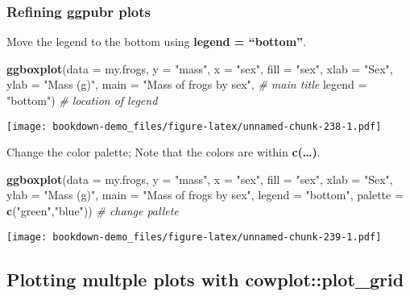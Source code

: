 \documentclass[]{book}
\newenvironment{Shaded}{\begin{snugshade}}{\end{snugshade}}
\newcommand{\KeywordTok}[1]{\textcolor[rgb]{0.13,0.29,0.53}{\textbf{#1}}}
\newcommand{\DataTypeTok}[1]{\textcolor[rgb]{0.13,0.29,0.53}{#1}}
\newcommand{\StringTok}[1]{\textcolor[rgb]{0.31,0.60,0.02}{#1}}
\newcommand{\CommentTok}[1]{\textcolor[rgb]{0.56,0.35,0.01}{\textit{#1}}}
\newcommand{\NormalTok}[1]{#1}
\theoremstyle{definition}
\theoremstyle{definition}
\theoremstyle{definition}
\theoremstyle{remark}
\begin{document}
\subsubsection{Refining ggpubr plots}\label{refining-ggpubr-plots}

Move the legend to the bottom using \textbf{legend = ``bottom''}.

\begin{Shaded}
\begin{Highlighting}[]
\KeywordTok{ggboxplot}\NormalTok{(}\DataTypeTok{data =}\NormalTok{ my.frogs,}
          \DataTypeTok{y =} \StringTok{"mass"}\NormalTok{,}
          \DataTypeTok{x =} \StringTok{"sex"}\NormalTok{,}
          \DataTypeTok{fill =} \StringTok{"sex"}\NormalTok{,}
          \DataTypeTok{xlab =} \StringTok{"Sex"}\NormalTok{,}
          \DataTypeTok{ylab =} \StringTok{"Mass (g)"}\NormalTok{,}
          \DataTypeTok{main =} \StringTok{"Mass of frogs by sex"}\NormalTok{, }\CommentTok{# main title}
          \DataTypeTok{legend =} \StringTok{"bottom"}\NormalTok{)             }\CommentTok{# location of legend}
\end{Highlighting}
\end{Shaded}

\texttt{[image: bookdown-demo\_files/figure-latex/unnamed-chunk-238-1.pdf]}

Change the color palette; Note that the colors are within
\textbf{c(\ldots{})}.

\begin{Shaded}
\begin{Highlighting}[]
\KeywordTok{ggboxplot}\NormalTok{(}\DataTypeTok{data =}\NormalTok{ my.frogs,}
          \DataTypeTok{y =} \StringTok{"mass"}\NormalTok{,}
          \DataTypeTok{x =} \StringTok{"sex"}\NormalTok{,}
          \DataTypeTok{fill =} \StringTok{"sex"}\NormalTok{,}
          \DataTypeTok{xlab =} \StringTok{"Sex"}\NormalTok{,}
          \DataTypeTok{ylab =} \StringTok{"Mass (g)"}\NormalTok{,}
          \DataTypeTok{main =} \StringTok{"Mass of frogs by sex"}\NormalTok{,}
          \DataTypeTok{legend =} \StringTok{"bottom"}\NormalTok{,}
          \DataTypeTok{palette =} \KeywordTok{c}\NormalTok{(}\StringTok{"green"}\NormalTok{,}\StringTok{"blue"}\NormalTok{))  }\CommentTok{# change pallete}
\end{Highlighting}
\end{Shaded}

\texttt{[image: bookdown-demo\_files/figure-latex/unnamed-chunk-239-1.pdf]}

\subsection{Plotting multple plots with
cowplot::plot\_grid}\label{plotting-multple-plots-with-cowplotplot_grid}
\end{document}
